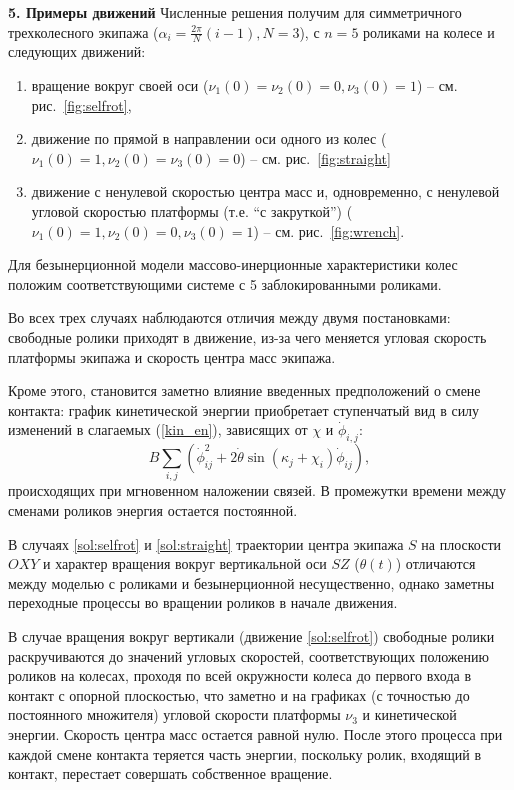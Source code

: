 
{\bf 5. Примеры движений}
Численные решения получим для симметричного трехколесного экипажа ($\alpha_i = \frac{2\pi}{N}(i - 1), N = 3$), с $n = 5$ роликами на колесе и следующих движений:
\begin{enumerate}
  \item \label{sol:selfrot} вращение вокруг своей оси ($\nu_1(0) = \nu_2(0) = 0, \nu_3(0) = 1$) -- см. рис.~\ref{fig:selfrot},
  \item \label{sol:straight} движение по прямой в направлении оси одного из колес ($\nu_1(0) = 1, \nu_2(0) = \nu_3(0) = 0$) -- см. рис.~\ref{fig:straight}
  \item \label{sol:wrench} движение с ненулевой скоростью центра масс и, одновременно, с ненулевой угловой скоростью платформы (т.е. ``с закруткой'') ($\nu_1(0) = 1, \nu_2(0) = 0, \nu_3(0) = 1$) -- см. рис.~\ref{fig:wrench}.
\end{enumerate}

Для безынерционной модели массово-инерционные характеристики колес положим соответствующими системе с 5 заблокированными роликами.

Во всех трех случаях наблюдаются отличия между двумя постановками: свободные ролики приходят в движение, из-за чего меняется угловая скорость платформы экипажа и скорость центра масс экипажа.

Кроме этого, становится заметно влияние введенных предположений о смене контакта: график кинетической энергии приобретает ступенчатый вид в силу изменений в слагаемых (\ref{kin_en}), зависящих от $\chi$ и $\dot{\phi}_{i,j}$: 
\begin{equation}\label{sines_in_kin_en}
    B\sum_{i,j}(\dot{\phi}_{ij}^2 + 2\dot{\theta}\sin(\kappa_j + \chi_i)\dot{\phi}_{ij}),
\end{equation}
происходящих при мгновенном наложении связей. В промежутки времени между сменами роликов энергия остается постоянной. 

В случаях \ref{sol:selfrot} и \ref{sol:straight} траектории центра экипажа $S$ на плоскости $OXY$ и характер вращения вокруг вертикальной оси $SZ$ ($\theta(t)$) отличаются между моделью с роликами и безынерционной несущественно, однако заметны переходные процессы во вращении роликов в начале движения.

В случае вращения вокруг вертикали (движение \ref{sol:selfrot}) свободные ролики раскручиваются до значений угловых скоростей, соответствующих положению роликов на колесах, проходя по всей окружности колеса до первого входа в контакт с опорной плоскостью, что заметно и на графиках  (с точностью до постоянного множителя) угловой скорости платформы $\nu_3$ и кинетической энергии. Скорость центра масс остается равной нулю. После этого процесса при каждой смене контакта теряется часть энергии, поскольку ролик, входящий в контакт, перестает совершать собственное вращение. 

